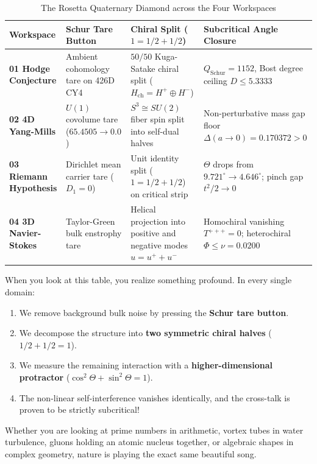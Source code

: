 \documentclass[11pt,a4paper]{article}
\theoremstyle{definition}
\begin{document}
\begin{table}[htbp]
\centering
\small
\caption{The Rosetta Quaternary Diamond across the Four Workspaces}
\begin{tabular}{p{3.2cm}p{3.0cm}p{3.8cm}p{3.8cm}}
\toprule
\textbf{Workspace} & \textbf{Schur Tare Button} & \textbf{Chiral Split ($1 = 1/2 + 1/2$)} & \textbf{Subcritical Angle Closure} \\
\midrule
\textbf{01 Hodge Conjecture} & Ambient cohomology tare on 426D CY4 & $50/50$ Kuga-Satake chiral split ($H_{\mathrm{ch}} = H^+ \oplus H^-$) & $Q_{\mathrm{Schur}} = 1152$, Bost degree ceiling $D \le 5.3333$ \\
\addlinespace
\textbf{02 4D Yang-Mills} & $U(1)$ covolume tare ($65.4505 \to 0.0$) & $S^3 \cong SU(2)$ fiber spin split into self-dual halves & Non-perturbative mass gap floor $\Delta(a \to 0) = 0.170372 > 0$ \\
\addlinespace
\textbf{03 Riemann Hypothesis} & Dirichlet mean carrier tare ($D_1 = 0$) & Unit identity split ($1 = 1/2 + 1/2$) on critical strip & $\Theta$ drops from $9.721^\circ \to 4.646^\circ$; pinch gap $t^2/2 \to 0$ \\
\addlinespace
\textbf{04 3D Navier-Stokes} & Taylor-Green bulk enstrophy tare & Helical projection into positive and negative modes $u = u^+ + u^-$ & Homochiral vanishing $T^{+++} = 0$; heterochiral $\Phi \le \nu = 0.0200$ \\
\bottomrule
\end{tabular}
\end{table}

\noindent When you look at this table, you realize something profound. In every single domain:
\begin{enumerate}
\item We remove background bulk noise by pressing the \textbf{Schur tare button}.
\item We decompose the structure into \textbf{two symmetric chiral halves} ($1/2 + 1/2 = 1$).
\item We measure the remaining interaction with a \textbf{higher-dimensional protractor} ($\cos^2\Theta + \sin^2\Theta = 1$).
\item The non-linear self-interference vanishes identically, and the cross-talk is proven to be strictly subcritical!
\end{enumerate}

Whether you are looking at prime numbers in arithmetic, vortex tubes in water turbulence, gluons holding an atomic nucleus together, or algebraic shapes in complex geometry, nature is playing the exact same beautiful song.
\end{document}
